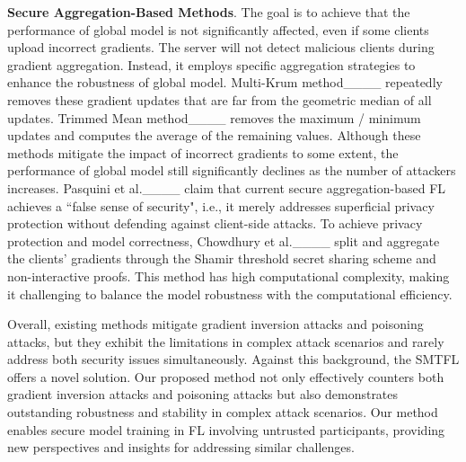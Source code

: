 \textbf{Secure Aggregation-Based Methods}. The goal is to achieve that the performance of global model is not significantly affected, even if some clients upload incorrect gradients. The server will not detect malicious clients during gradient aggregation. Instead, it employs specific aggregation strategies to enhance the robustness of global model. Multi-Krum method____ repeatedly removes these gradient updates that are far from the geometric median of all updates. Trimmed Mean method____ removes the maximum / minimum updates and computes the average of the remaining values. Although these methods mitigate the impact of incorrect gradients to some extent, the performance of global model still significantly declines as the number of attackers increases. Pasquini et al.____ claim that current secure aggregation-based FL achieves a ``false sense of security", i.e., it merely addresses superficial privacy protection without defending against client-side attacks. To achieve privacy protection and model correctness, Chowdhury et al.____ split and aggregate the clients' gradients through the Shamir threshold secret sharing scheme and non-interactive proofs. This method has high computational complexity, making it challenging to balance the model robustness with the computational efficiency.

Overall, existing methods mitigate gradient inversion attacks and poisoning attacks, but they exhibit the limitations in complex attack scenarios and rarely address both security issues simultaneously. Against this background, the SMTFL offers a novel solution. Our proposed method not only effectively counters both gradient inversion attacks and poisoning attacks but also demonstrates outstanding robustness and stability in complex attack scenarios. Our method enables secure model training in FL involving untrusted participants, providing new perspectives and insights for addressing similar challenges.